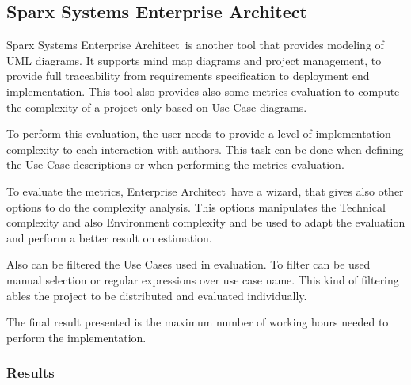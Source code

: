 \subsection{Sparx Systems Enterprise Architect}
\def \entArch {\textsf{Enterprise Architect}}
Sparx Systems \entArch\ is another tool that provides modeling of UML diagrams.
It supports mind map diagrams and project management, to provide full traceability from requirements specification to deployment end implementation.
This tool also provides also some metrics evaluation to compute the complexity of a project only based on Use Case diagrams. 

To perform this evaluation, the user needs to provide a level of implementation complexity to each interaction with authors. 
This task can be done when defining the Use Case descriptions or when performing the metrics evaluation.

To evaluate the metrics, \entArch\ have a wizard, that gives also other options to do the complexity analysis.
This options manipulates the Technical complexity and also Environment complexity and be used to adapt the evaluation and perform a better result on estimation.

Also can be filtered the Use Cases used in evaluation. 
To filter can be used manual selection or regular expressions over use case name.
This kind of filtering ables the project to be distributed and evaluated individually.

The final result presented is the maximum number of working hours needed to perform the implementation.

\subsubsection{Results}
